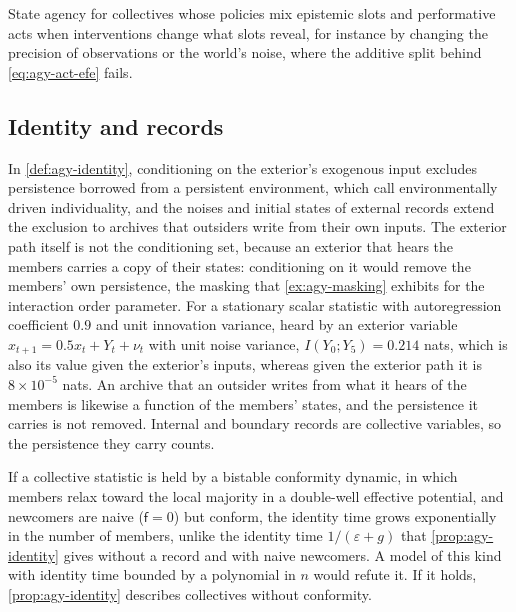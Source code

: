 \begin{openproblem}\label{open:agy-mixed-policies}
State agency for collectives whose policies mix epistemic slots and performative acts when interventions change what slots reveal, for instance by changing the precision of observations or the world's noise, where the additive split behind \eqref{eq:agy-act-efe} fails.
\end{openproblem}

\subsection{Identity and records}\label{sup:agy-identity-and-records}

In \cref{def:agy-identity}, conditioning on the exterior's exogenous input excludes persistence borrowed from a persistent environment, which \citet{krakauer2020information} call environmentally driven individuality, and the noises and initial states of external records extend the exclusion to archives that outsiders write from their own inputs. The exterior path itself is not the conditioning set, because an exterior that hears the members carries a copy of their states: conditioning on it would remove the members' own persistence, the masking that \cref{ex:agy-masking} exhibits for the interaction order parameter. For a stationary scalar statistic with autoregression coefficient $0.9$ and unit innovation variance, heard by an exterior variable $x_{t+1}=0.5x_t+Y_t+\nu_t$ with unit noise variance, $I(Y_0;Y_5)=0.214$ nats, which is also its value given the exterior's inputs, whereas given the exterior path it is $8\times10^{-5}$ nats. An archive that an outsider writes from what it hears of the members is likewise a function of the members' states, and the persistence it carries is not removed. Internal and boundary records are collective variables, so the persistence they carry counts.

\begin{conjecture}\label{conj:agy-conformity-identity}
If a collective statistic is held by a bistable conformity dynamic, in which members relax toward the local majority in a double-well effective potential, and newcomers are naive ($\mathsf f=0$) but conform, the identity time grows exponentially in the number of members, unlike the identity time $1/(\varepsilon+g)$ that \cref{prop:agy-identity} gives without a record and with naive newcomers. A model of this kind with identity time bounded by a polynomial in $n$ would refute it. If it holds, \cref{prop:agy-identity} describes collectives without conformity.
\end{conjecture}

